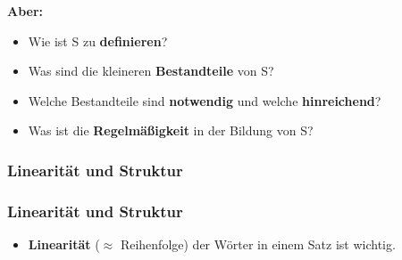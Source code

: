 \begin{frame}

\textbf{Aber: }
	\begin{itemize}
		\item Wie ist S zu \textbf{definieren}?
		\item Was sind die kleineren \textbf{Bestandteile} von S?
		\item Welche Bestandteile sind \textbf{notwendig} und welche \textbf{hinreichend}?
		\item Was ist die \textbf{Regelmäßigkeit} in der Bildung von S?
	\end{itemize}	 	

\end{frame}

\subsubsection{Linearität und Struktur}



\begin{frame}
\frametitle{Linearität und Struktur}

\begin{itemize}
	\item \textbf{Linearität} ($\approx$ Reihenfolge) der Wörter in einem Satz ist wichtig.
	
	\z
	
	\z

\end{itemize}

\end{frame}

